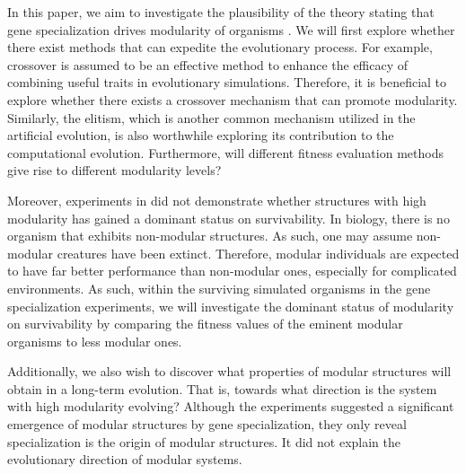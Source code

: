 In this paper, we aim to investigate the plausibility of the theory stating that gene specialization drives modularity of organisms \cite{espinosa2010specialization}. We will first explore whether there exist methods that can expedite the evolutionary process. For example, crossover is assumed to be an effective method to enhance the efficacy of combining useful traits in evolutionary simulations. Therefore, it is beneficial to explore whether there exists a crossover mechanism that can promote modularity. Similarly, the elitism, which is another common mechanism utilized in the artificial evolution, is also worthwhile exploring its contribution to the computational evolution. Furthermore, will different fitness evaluation methods give rise to different modularity levels?

Moreover, experiments in \cite{espinosa2010specialization} did not demonstrate whether structures with high modularity has gained a dominant status on survivability. In biology, there is no organism that exhibits non-modular structures. As such, one may assume non-modular creatures have been extinct. Therefore, modular individuals are expected to have far better performance than non-modular ones, especially for complicated environments. As such, within the surviving simulated organisms in the gene specialization experiments, we will investigate the dominant status of modularity on survivability by comparing the fitness values of the eminent modular organisms to less modular ones.

Additionally, we also wish to discover what properties of modular structures will obtain in a long-term evolution. That is, towards what direction is the system with high modularity evolving? Although the experiments suggested a significant emergence of modular structures by gene specialization, they only reveal specialization is the origin of modular structures. It did not explain the evolutionary direction of modular systems. 